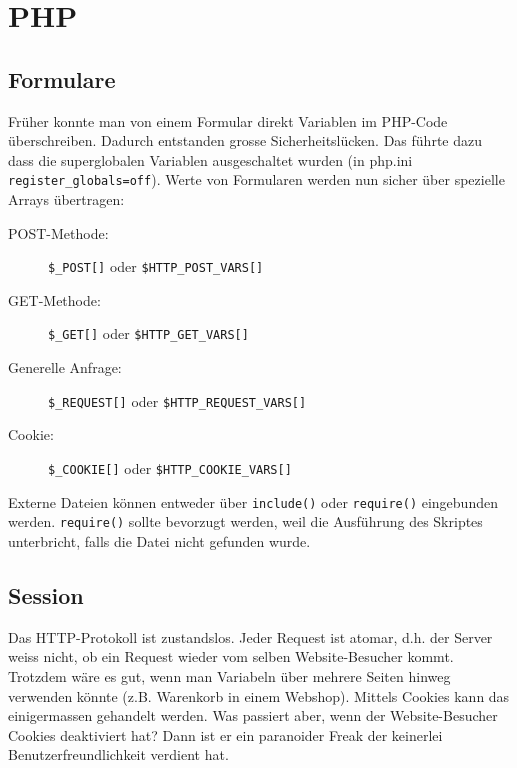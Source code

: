 \chapter{PHP}


\section{Formulare}

Früher konnte man von einem Formular direkt Variablen im PHP-Code überschreiben. Dadurch entstanden grosse Sicherheitslücken. Das führte dazu dass die superglobalen Variablen ausgeschaltet wurden (in php.ini \verb|register_globals=off|). Werte von Formularen werden nun sicher über spezielle Arrays übertragen:

\begin{description}
	\item[POST-Methode:] \verb|$_POST[]| oder \verb|$HTTP_POST_VARS[]|
	\item[GET-Methode:] \verb|$_GET[]| oder \verb|$HTTP_GET_VARS[]|
	\item[Generelle Anfrage:] \verb|$_REQUEST[]| oder \verb|$HTTP_REQUEST_VARS[]|
	\item[Cookie:] \verb|$_COOKIE[]| oder \verb|$HTTP_COOKIE_VARS[]|
\end{description}

Externe Dateien können entweder über \verb|include()| oder \verb|require()| eingebunden werden. \verb|require()| sollte bevorzugt werden, weil die Ausführung des Skriptes unterbricht, falls die Datei nicht gefunden wurde.

\section{Session}

Das HTTP-Protokoll ist zustandslos. Jeder Request ist atomar, d.h. der Server weiss nicht, ob ein Request wieder vom selben Website-Besucher kommt. Trotzdem wäre es gut, wenn man Variabeln über mehrere Seiten hinweg verwenden könnte (z.B. Warenkorb in einem Webshop). Mittels Cookies kann das einigermassen gehandelt werden. Was passiert aber, wenn der Website-Besucher Cookies deaktiviert hat? Dann ist er ein paranoider Freak der keinerlei Benutzerfreundlichkeit verdient hat.

